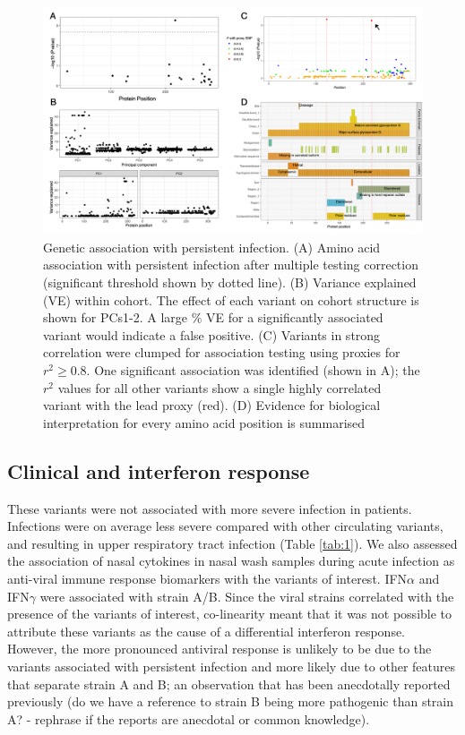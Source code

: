 \documentclass{article}
\begin{document}
\begin{figure}[ht] \hspace{-0.5cm} 
    \includegraphics[scale=0.85]{f3}
	\caption{Genetic association with persistent infection. (A) Amino acid association with persistent infection after multiple testing correction (significant threshold shown by dotted line). (B) Variance explained (VE) within cohort. The effect of each variant on cohort structure is shown for PCs1-2. A large \% VE for a significantly associated variant would indicate a false positive. (C) Variants in strong correlation were clumped for association testing using proxies for $r^2 \ge 0.8$. One significant association was identified (shown in A); the $r^2$ values for all other variants show a single highly correlated variant with the lead proxy (red). 
	(D) Evidence for biological interpretation for every amino acid position is summarised}
	\label{fig:3}
\end{figure}
\clearpage

\subsection{Clinical and interferon response}
These variants were not associated with more severe infection in patients. 
Infections were on average less severe compared with other circulating variants, and resulting in upper respiratory tract infection (Table \ref{tab:1}). 
We also assessed the association of nasal cytokines in nasal wash samples during acute infection as anti-viral immune response biomarkers with the variants of interest.
IFN$\alpha$ and IFN$\gamma$ were associated with strain A/B.
Since the viral strains correlated with the presence of the variants of interest, co-linearity meant that it was not possible to attribute these variants as the cause of a differential interferon response.
However, the more pronounced antiviral response is unlikely to be due to the variants associated with persistent infection and more likely due to other features that separate strain A and B; an observation that has been anecdotally reported previously 
(do we have a reference to strain B being more pathogenic than strain A? - rephrase if the reports are anecdotal or common knowledge). 
\end{document}
